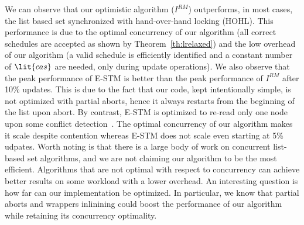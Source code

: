 \documentclass[11pt,pdftex,letterpaper]{article}
\begin{document}
We can observe that our optimistic algorithm ($I^{RM}$) outperforms, in most cases, the list based set synchronized with hand-over-hand locking (HOHL). 
This performance is due to the optimal concurrency of our algorithm (all correct schedules are accepted as shown by Theorem~\ref{th:lrelaxed}) and the low overhead of our algorithm (a valid schedule is efficiently identified and a constant number of $\lit{cas}$ are needed, only during update operations).
We also observe that the peak performance of E-STM is better than the peak performance of $I^{RM}$ after 10\% updates.
This is due to the fact that our code, kept intentionally simple, 
is not optimized with partial aborts, hence it always restarts from the beginning of the list upon abort. By contrast, E-STM is optimized to re-read 
only one node upon some conflict detection~\cite{FGG09}.   The optimal concurrency of our algorithm makes it scale despite contention whereas E-STM does not scale even starting at 5\% udpates.
Worth noting is that there is a large body of work on concurrent list-based set algorithms, and we are not claiming our algorithm to be the most efficient. 
Algorithms that are not optimal with respect to concurrency can achieve better results on some workload with a lower overhead. 
An interesting question is how far can our implementation be optimized. In particular, we know that partial aborts and wrappers inlinining could 
boost the performance of our algorithm while retaining its concurrency optimality.



 
\end{document}
